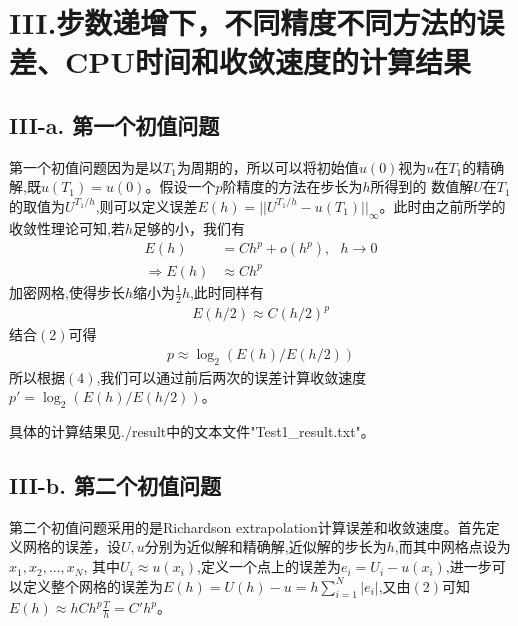 \documentclass[twoside,a4paper]{article}
\begin{document}
\newpage
\section*{III.步数递增下，不同精度不同方法的误差、CPU时间和收敛速度的计算结果}
\subsection*{III-a. 第一个初值问题}
\hspace{0.8em}
第一个初值问题因为是以$T_1$为周期的，所以可以将初始值$u(0)$视为$u$在$T_1$的精确解,既$u(T_1)=u(0)$。假设一个$p$阶精度的方法在步长为$h$所得到的
数值解$U$在$T_1$的取值为$U^{T_1/h}$,则可以定义误差$E(h)=||U^{T_1/h}-u(T_1)||_{\infty}$。此时由之前所学的收敛性理论可知,若$h$足够的小，我们有
\begin{align}
    E(h)              & =Ch^p+o(h^p),\ \ \  h \rightarrow 0 \\
    \Rightarrow  E(h) & \approx Ch^p
\end{align}
加密网格,使得步长$h$缩小为$\frac{1}{2}h$,此时同样有
\begin{align}
    E(h/2) \approx C(h/2)^p
\end{align}
结合$(2)$可得
\begin{align}
    p\approx \log_2(E(h)/E(h/2))
\end{align}
所以根据$(4)$,我们可以通过前后两次的误差计算收敛速度$p'=\log_2(E(h)/E(h/2))$。

具体的计算结果见./result中的文本文件"Test1\_result.txt"。

\subsection*{III-b. 第二个初值问题}
\hspace{0.8em}
第二个初值问题采用的是Richardson extrapolation计算误差和收敛速度。首先定义网格的误差，设$U,u$分别为近似解和精确解,近似解的步长为$h$,而其中网格点设为$x_1,x_2,...,x_N$,
其中$U_i\approx u(x_i)$,定义一个点上的误差为$e_i=U_i-u(x_i)$,进一步可以定义整个网格的误差为$E(h)=U(h)-u=h\sum\limits_{i=1}^N|e_i|$,又由$(2)$可知$E(h)\approx hCh^p\frac{T}{h}=C'h^p$。
\end{document}
